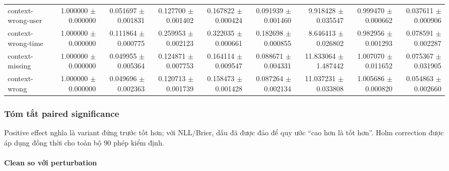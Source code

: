 \begin{table}[!htbp]
\begin{adjustbox}{max width=\textwidth}
\begin{tabular}{@{}lrrrrrrrr@{}}
context-wrong-user & 1.000000 $\pm$ 0.000000 & 0.051697 $\pm$ 0.001831 & 0.127700 $\pm$ 0.001402 & 0.167822 $\pm$ 0.000424 & 0.091939 $\pm$ 0.001460 & 9.918428 $\pm$ 0.035547 & 0.999470 $\pm$ 0.000662 & 0.037611 $\pm$ 0.000906 \\
context-wrong-time & 1.000000 $\pm$ 0.000000 & 0.111864 $\pm$ 0.000775 & 0.259953 $\pm$ 0.002123 & 0.322035 $\pm$ 0.000661 & 0.182698 $\pm$ 0.000855 & 8.646413 $\pm$ 0.026802 & 0.982956 $\pm$ 0.001293 & 0.078591 $\pm$ 0.002287 \\
context-missing & 1.000000 $\pm$ 0.000000 & 0.049955 $\pm$ 0.005364 & 0.124871 $\pm$ 0.007753 & 0.164114 $\pm$ 0.009547 & 0.088671 $\pm$ 0.004331 & 11.833064 $\pm$ 1.487442 & 1.007070 $\pm$ 0.011652 & 0.075367 $\pm$ 0.031905 \\
context-wrong & 1.000000 $\pm$ 0.000000 & 0.049696 $\pm$ 0.002363 & 0.120713 $\pm$ 0.001739 & 0.158473 $\pm$ 0.001428 & 0.087264 $\pm$ 0.002134 & 11.037231 $\pm$ 0.033808 & 1.005686 $\pm$ 0.000820 & 0.054863 $\pm$ 0.002660 \\
\bottomrule
\end{tabular}
\end{adjustbox}
\end{table}

\subsubsection*{Tóm tắt paired significance}

Positive effect nghĩa là variant đứng trước tốt hơn; với NLL/Brier, dấu đã được đảo để quy ước “cao hơn là tốt hơn”. Holm correction được áp dụng đồng thời cho toàn bộ 90 phép kiểm định.

\paragraph{Clean so với perturbation}

